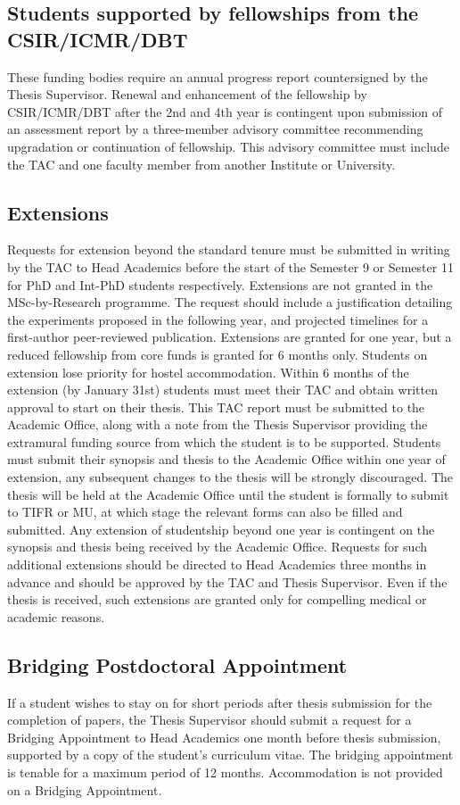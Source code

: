 \documentclass[a4paper,10pt]{article}
\begin{document}
\subsection{Students supported by fellowships from the CSIR/ICMR/DBT} These funding bodies
require an annual progress report countersigned by the Thesis Supervisor. Renewal and
enhancement of the fellowship by CSIR/ICMR/DBT after the 2nd and 4th year is contingent
upon submission of an assessment report by a three-member advisory committee
recommending upgradation or continuation of fellowship. This advisory committee must
include the TAC and one faculty member from another Institute or University.

\subsection{Extensions} Requests for extension beyond the standard tenure must be submitted in writing
by the TAC to Head Academics before the start of the Semester 9 or Semester 11 for PhD
and Int-PhD students respectively. Extensions are not granted in the MSc-by-Research
programme. The request should include a justification detailing the experiments proposed in
the following year, and projected timelines for a first-author peer-reviewed publication.
Extensions are granted for one year, but a reduced fellowship from core funds is granted for
6 months only. Students on extension lose priority for hostel accommodation. Within 6
months of the extension (by January 31st) students must meet their TAC and obtain written
approval to start on their thesis. This TAC report must be submitted to the Academic Office,
along with a note from the Thesis Supervisor providing the extramural funding source from
which the student is to be supported. Students must submit their synopsis and thesis to the
Academic Office within one year of extension, any subsequent changes to the thesis will be
strongly discouraged. The thesis will be held at the Academic Office until the student is
formally to submit to TIFR or MU, at which stage the relevant forms can also be filled and
submitted. Any extension of studentship beyond one year is contingent on the synopsis and
thesis being received by the Academic Office. Requests for such additional extensions
should be directed to Head Academics three months in advance and should be approved by
the TAC and Thesis Supervisor. Even if the thesis is received, such extensions are granted
only for compelling medical or academic reasons.

\subsection{Bridging Postdoctoral Appointment}
If a student wishes to stay on for short periods after
thesis submission for the completion of papers, the Thesis Supervisor should submit a
request for a Bridging Appointment to Head Academics one month before thesis
submission, supported by a copy of the student’s curriculum vitae. The bridging
appointment is tenable for a maximum period of 12 months. Accommodation is not
provided on a Bridging Appointment.
\end{document}
